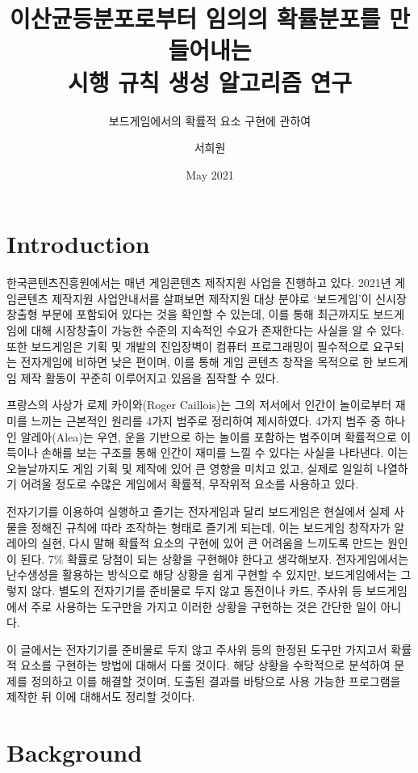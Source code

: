 \documentclass[11pt]{article}
\title{이산균등분포로부터 임의의 확률분포를 만들어내는\\시행 규칙 생성 알고리즘 연구}
\subtitle{보드게임에서의 확률적 요소 구현에 관하여}
\author{서희원}
\date{May 2021}
\begin{document}
\maketitle
\doublespacing

\section{Introduction}
한국콘텐츠진흥원에서는 매년 게임콘텐츠 제작지원 사업을 진행하고 있다. 2021년 게임콘텐츠 제작지원 사업안내서를 살펴보면 제작지원 대상 분야로 `보드게임'이 신시장창출형 부문에 포함되어 있다는 것\cite{contents2021}을 확인할 수 있는데, 이를 통해 최근까지도 보드게임에 대해 시장창출이 가능한 수준의 지속적인 수요가 존재한다는 사실을 알 수 있다. 또한 보드게임은 기획 및 개발의 진입장벽이 컴퓨터 프로그래밍이 필수적으로 요구되는 전자게임에 비하면 낮은 편이며, 이를 통해 게임 콘텐츠 창작을 목적으로 한 보드게임 제작 활동이 꾸준히 이루어지고 있음을 짐작할 수 있다.

프랑스의 사상가 로제 카이와(Roger Caillois)는 그의 저서에서 인간이 놀이로부터 재미를 느끼는 근본적인 원리를 4가지 범주로 정리하여 제시하였다.\cite{roger} 4가지 범주 중 하나인 알레아(Alea)는 우연, 운을 기반으로 하는 놀이를 포함하는 범주이며 확률적으로 이득이나 손해를 보는 구조를 통해 인간이 재미를 느낄 수 있다는 사실을 나타낸다. 이는 오늘날까지도 게임 기획 및 제작에 있어 큰 영향을 미치고 있고, 실제로 일일히 나열하기 어려울 정도로 수많은 게임에서 확률적, 무작위적 요소를 사용하고 있다.

전자기기를 이용하여 실행하고 즐기는 전자게임과 달리 보드게임은 현실에서 실제 사물을 정해진 규칙에 따라 조작하는 형태로 즐기게 되는데, 이는 보드게임 창작자가 알레아의 실현, 다시 말해 확률적 요소의 구현에 있어 큰 어려움을 느끼도록 만드는 원인이 된다. 7\% 확률로 당첨이 되는 상황을 구현해야 한다고 생각해보자. 전자게임에서는 난수생성을 활용하는 방식으로 해당 상황을 쉽게 구현할 수 있지만, 보드게임에서는 그렇지 않다. 별도의 전자기기를 준비물로 두지 않고 동전이나 카드, 주사위 등 보드게임에서 주로 사용하는 도구만을 가지고 이러한 상황을 구현하는 것은 간단한 일이 아니다.

이 글에서는 전자기기를 준비물로 두지 않고 주사위 등의 한정된 도구만 가지고서 확률적 요소를 구현하는 방법에 대해서 다룰 것이다. 해당 상황을 수학적으로 분석하여 문제를 정의하고 이를 해결할 것이며, 도출된 결과를 바탕으로 사용 가능한 프로그램을 제작한 뒤 이에 대해서도 정리할 것이다.

\section{Background}
\end{document}
